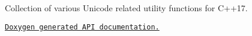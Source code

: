 \href{https://travis-ci.com/peelonet/peelo-unicode}{\tt }

Collection of various Unicode related utility functions for C++17.

\href{https://peelonet.github.io/peelo-unicode/index.html}{\tt Doxygen generated A\+PI documentation.} 